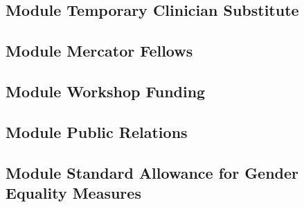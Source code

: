 \documentclass{scrartcl}
\begin{document}
\subsection{Module Temporary Clinician Substitute}

\subsection{Module Mercator Fellows}

\subsection{Module Workshop Funding}

\subsection{Module Public Relations}

\subsection{Module Standard Allowance for Gender Equality Measures}



\end{document}
